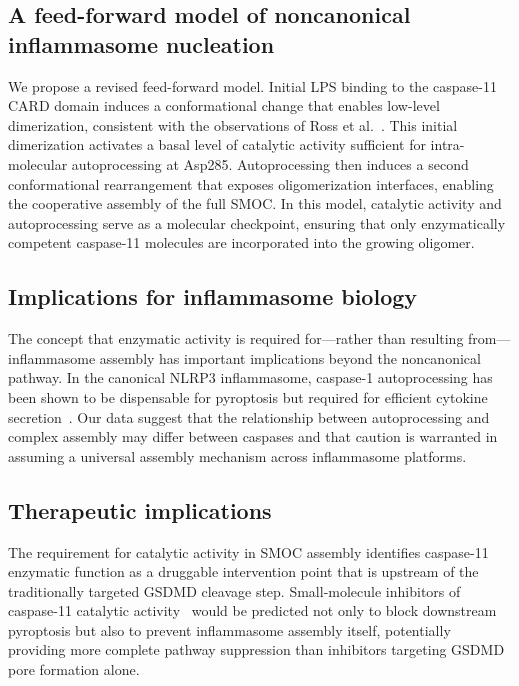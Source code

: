 \documentclass[11pt,a4paper]{article}
\begin{document}
\subsection{A feed-forward model of noncanonical inflammasome nucleation}

We propose a revised feed-forward model. Initial LPS binding to the caspase-11 CARD domain induces a conformational change that enables low-level dimerization, consistent with the observations of Ross et al.~\citep{ross2022}. This initial dimerization activates a basal level of catalytic activity sufficient for intra-molecular autoprocessing at Asp285. Autoprocessing then induces a second conformational rearrangement that exposes oligomerization interfaces, enabling the cooperative assembly of the full SMOC. In this model, catalytic activity and autoprocessing serve as a molecular checkpoint, ensuring that only enzymatically competent caspase-11 molecules are incorporated into the growing oligomer.

\subsection{Implications for inflammasome biology}

The concept that enzymatic activity is required for---rather than resulting from---inflammasome assembly has important implications beyond the noncanonical pathway. In the canonical NLRP3 inflammasome, caspase-1 autoprocessing has been shown to be dispensable for pyroptosis but required for efficient cytokine secretion~\citep{broz2010}. Our data suggest that the relationship between autoprocessing and complex assembly may differ between caspases and that caution is warranted in assuming a universal assembly mechanism across inflammasome platforms.

\subsection{Therapeutic implications}

The requirement for catalytic activity in SMOC assembly identifies caspase-11 enzymatic function as a druggable intervention point that is upstream of the traditionally targeted GSDMD cleavage step. Small-molecule inhibitors of caspase-11 catalytic activity~\citep{aglietti2016} would be predicted not only to block downstream pyroptosis but also to prevent inflammasome assembly itself, potentially providing more complete pathway suppression than inhibitors targeting GSDMD pore formation alone.
\end{document}
